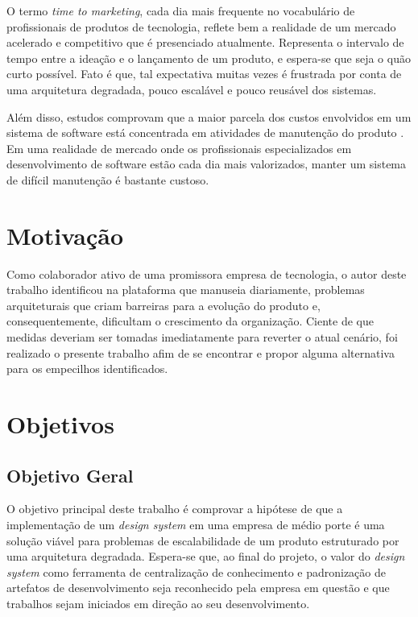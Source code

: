 O termo \textit{time to marketing}, cada dia mais frequente no vocabulário de profissionais de produtos de tecnologia, reflete bem a realidade de um mercado acelerado e competitivo que é presenciado atualmente. Representa o intervalo de tempo entre a ideação e o lançamento de um produto, e espera-se que seja o quão curto possível. Fato é que, tal expectativa muitas vezes é frustrada por conta de uma arquitetura degradada, pouco escalável e pouco reusável dos sistemas.

Além disso, estudos comprovam que a maior parcela dos custos envolvidos em um sistema de software está concentrada em atividades de manutenção do produto \cite{softwareCost}. Em uma realidade de mercado onde os profissionais especializados em desenvolvimento de software estão cada dia mais valorizados, manter um sistema de difícil manutenção é bastante custoso.

\section{Motivação}
\label{sec:motivacao}

Como colaborador ativo de uma promissora empresa de tecnologia, o autor deste trabalho identificou na plataforma que manuseia diariamente, problemas arquiteturais que criam barreiras para a evolução do produto e, consequentemente, dificultam o crescimento da organização. Ciente de que medidas deveriam ser tomadas imediatamente para reverter o atual cenário, foi realizado o presente trabalho afim de se encontrar e propor alguma alternativa para os empecilhos identificados.

\section{Objetivos}
\label{sec:objetivos}

\subsection{Objetivo Geral}

O objetivo principal deste trabalho é comprovar a hipótese de que a implementação de um \textit{design system} em uma empresa de médio porte é uma solução viável para problemas de escalabilidade de um produto estruturado por uma arquitetura degradada. Espera-se que, ao final do projeto, o valor do \textit{design system} como ferramenta de centralização de conhecimento e padronização de artefatos de desenvolvimento seja reconhecido pela empresa em questão e que trabalhos sejam iniciados em direção ao seu desenvolvimento.

